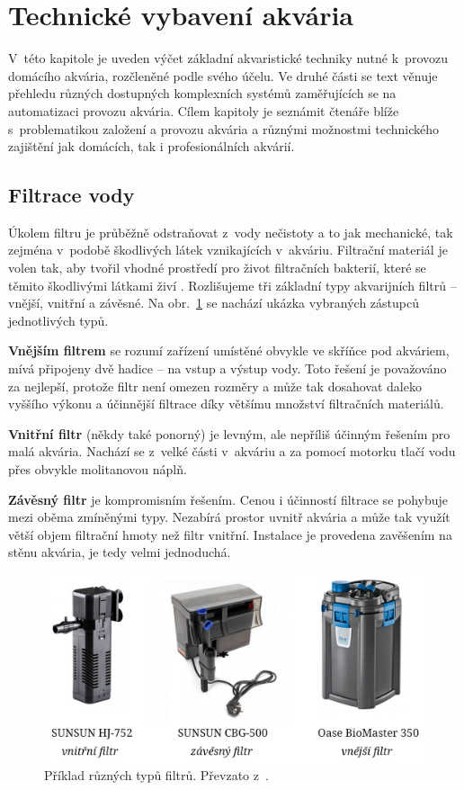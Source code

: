 \section{Technické vybavení akvária}
    V~této kapitole je uveden výčet základní akvaristické techniky nutné k~provozu domácího akvária, rozčleněné podle svého účelu. Ve druhé části se text věnuje přehledu různých dostupných komplexních systémů zaměřujících se na automatizaci provozu akvária. Cílem kapitoly je seznámit čtenáře blíže s~problematikou založení a provozu akvária a různými možnostmi technického zajištění jak domácích, tak i profesionálních akvárií.
    \subsection{Filtrace vody}
        Úkolem filtru je průběžně odstraňovat z~vody nečistoty a to jak mechanické, tak zejména v~podobě škodlivých látek vznikajících v~akváriu. Filtrační materiál je volen tak, aby tvořil vhodné prostředí pro život filtračních bakterií, které se těmito škodlivými látkami živí \cite{yt-filtrace}. Rozlišujeme tři základní typy akvarijních filtrů -- vnější, vnitřní a závěsné. Na obr.~\ref{fig:filtry-srovnani} se nachází ukázka vybraných zástupců jednotlivých typů.
        
        \textbf{Vnějším filtrem} se rozumí zařízení umístěné obvykle ve skříňce pod akváriem, mívá připojeny dvě hadice -- na vstup a výstup vody. Toto řešení je považováno za nejlepší, protože filtr není omezen rozměry a může tak dosahovat daleko vyššího výkonu a účinnější filtrace díky většímu množství filtračních materiálů. 

        \textbf{Vnitřní filtr} (někdy také ponorný) je levným, ale nepříliš účinným řešením pro malá akvária. Nachází se z~velké části v~akváriu a za pomocí motorku tlačí vodu přes obvykle molitanovou náplň.

        \textbf{Závěsný filtr}  je kompromisním řešením.  Cenou i účinností filtrace se pohybuje mezi oběma zmíněnými typy. Nezabírá prostor uvnitř akvária a může tak využít větší objem filtrační hmoty než filtr vnitřní. Instalace je provedena zavěšením na stěnu akvária, je tedy velmi jednoduchá. 

        \begin{figure}[h!]
            \centering
            \includegraphics[width=\textwidth]{obrazky/filtry/filtry.jpg}
            \caption{Příklad různých typů filtrů. Převzato z~\cite{eshop-rostlinna-akvaria}.}
            \label{fig:filtry-srovnani}
        \end{figure}


